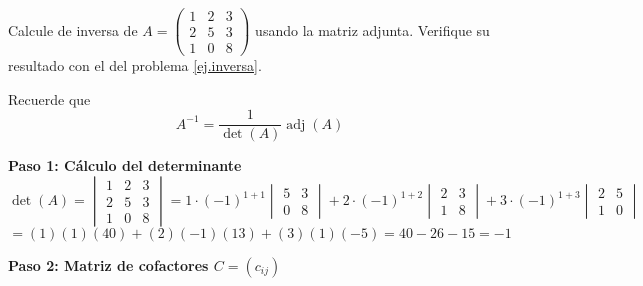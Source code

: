 \begin{prob} Calcule de inversa de \( A = \begin{pmatrix} 1 & 2 & 3 \\ 2 & 5 & 3 \\ 1 & 0 & 8 \end{pmatrix} \) usando la matriz adjunta. Verifique su resultado con el del problema \ref{ej.inversa}. 


\begin{myproof}
Recuerde que \[
A^{-1} = \frac{1}{\det(A)} \operatorname{adj}(A)
\]

\textbf{Paso 1: Cálculo del determinante}
\[
\det(A) = \begin{vmatrix} 1 & 2 & 3 \\ 2 & 5 & 3 \\ 1 & 0 & 8 \end{vmatrix} 
= 1\cdot(-1)^{1+1}\begin{vmatrix} 5 & 3 \\ 0 & 8 \end{vmatrix} 
+ 2\cdot(-1)^{1+2}\begin{vmatrix} 2 & 3 \\ 1 & 8 \end{vmatrix} 
+ 3\cdot(-1)^{1+3}\begin{vmatrix} 2 & 5 \\ 1 & 0 \end{vmatrix}
\]
\[
= (1)(1)(40) + (2)(-1)(13) + (3)(1)(-5) = 40 - 26 - 15 = \boxed{-1}
\]

\textbf{Paso 2: Matriz de cofactores \( C = (c_{ij}) \)}


\end{myproof}
\end{prob}
